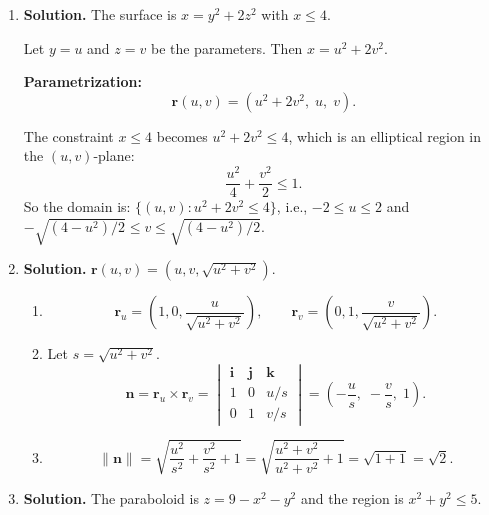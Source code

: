 \begin{enumerate}
Using cylindrical-style parameters, let $x=r\cos\theta$, $y=r\sin\theta$, and then $z=\pm\frac{r}{2}$, where $r\ge 0$.

\textbf{Parametric form:}
\[
\mathbf{r}(r,\theta) = \left(r\cos\theta,\; r\sin\theta,\; \pm\frac{r}{2}\right),
\]
with parameter constraints: $r\ge 0$, $0\le\theta\le 2\pi$ (or $0\le\theta <2\pi$).

The $+$ sign gives the upper cone ($z\ge 0$) and the $-$ sign gives the lower cone ($z\le 0$). Together they form the full double cone.

\item \textbf{Solution.}
The surface is $x = y^2+2z^2$ with $x\le 4$.

Let $y = u$ and $z = v$ be the parameters. Then $x = u^2+2v^2$.

\textbf{Parametrization:}
\[
\mathbf{r}(u,v)=(u^2+2v^2,\; u,\; v).
\]

The constraint $x\le 4$ becomes $u^2+2v^2\le 4$, which is an elliptical region in the $(u,v)$-plane:
\[
\frac{u^2}{4}+\frac{v^2}{2}\le 1.
\]
So the domain is: $\{(u,v): u^2+2v^2\le 4\}$, i.e., $-2\le u\le 2$ and $-\sqrt{(4-u^2)/2}\le v\le\sqrt{(4-u^2)/2}$.

\item \textbf{Solution.}
$\mathbf{r}(u,v)=(u, v, \sqrt{u^2+v^2})$.

\begin{enumerate}
\item
\[
\mathbf{r}_u = \left(1, 0, \frac{u}{\sqrt{u^2+v^2}}\right), \qquad \mathbf{r}_v = \left(0, 1, \frac{v}{\sqrt{u^2+v^2}}\right).
\]

\item Let $s=\sqrt{u^2+v^2}$.
\[
\mathbf{n}=\mathbf{r}_u\times\mathbf{r}_v = \begin{vmatrix}\mathbf{i}&\mathbf{j}&\mathbf{k}\\ 1&0&u/s\\ 0&1&v/s\end{vmatrix} = \left(-\frac{u}{s},\;-\frac{v}{s},\;1\right).
\]

\item
\[
\|\mathbf{n}\| = \sqrt{\frac{u^2}{s^2}+\frac{v^2}{s^2}+1} = \sqrt{\frac{u^2+v^2}{u^2+v^2}+1} = \sqrt{1+1}=\boxed{\sqrt{2}}.
\]
\end{enumerate}

\item \textbf{Solution.}
The paraboloid is $z=9-x^2-y^2$ and the region is $x^2+y^2\le 5$.


\end{enumerate}
